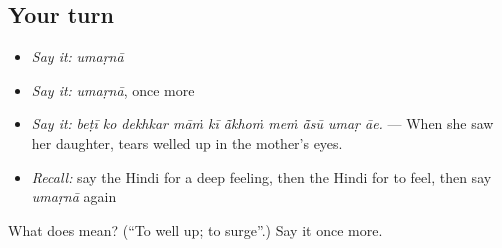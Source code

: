 \subsection*{Your turn}
\begin{itemize}
\raggedright
  \item \emph{Say it:} \emph{umaṛnā}
  \item \emph{Say it:} \emph{umaṛnā}, once more
  \item \emph{Say it:} \emph{beṭī ko dekhkar māṁ kī ā̃khoṁ meṁ ā̃sū umaṛ āe.} — When she saw her daughter, tears welled up in the mother's eyes.
  \item \emph{Recall:} say the Hindi for a deep feeling, then the Hindi for to feel, then say \emph{umaṛnā} again
\end{itemize}

\begin{tcolorbox}[breakable,colback=teal!4,colframe=teal!35!black,title={Before you move on}]
What does  mean? (\textquotedblleft{}To well up; to surge\textquotedblright{}.) Say it once more.
\end{tcolorbox}
